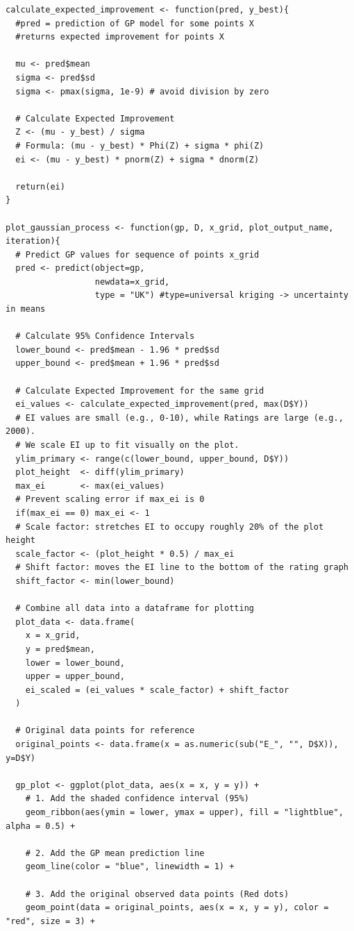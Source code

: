 \documentclass{article}
\begin{document}
\begin{verbatim}
calculate_expected_improvement <- function(pred, y_best){
  #pred = prediction of GP model for some points X
  #returns expected improvement for points X
  
  mu <- pred$mean
  sigma <- pred$sd
  sigma <- pmax(sigma, 1e-9) # avoid division by zero

  # Calculate Expected Improvement
  Z <- (mu - y_best) / sigma
  # Formula: (mu - y_best) * Phi(Z) + sigma * phi(Z)
  ei <- (mu - y_best) * pnorm(Z) + sigma * dnorm(Z)
  
  return(ei)
}

plot_gaussian_process <- function(gp, D, x_grid, plot_output_name, iteration){
  # Predict GP values for sequence of points x_grid
  pred <- predict(object=gp,
                  newdata=x_grid,
                  type = "UK") #type=universal kriging -> uncertainty in means
  
  # Calculate 95% Confidence Intervals
  lower_bound <- pred$mean - 1.96 * pred$sd
  upper_bound <- pred$mean + 1.96 * pred$sd
  
  # Calculate Expected Improvement for the same grid
  ei_values <- calculate_expected_improvement(pred, max(D$Y))
  # EI values are small (e.g., 0-10), while Ratings are large (e.g., 2000).
  # We scale EI up to fit visually on the plot.
  ylim_primary <- range(c(lower_bound, upper_bound, D$Y))
  plot_height  <- diff(ylim_primary)
  max_ei       <- max(ei_values)
  # Prevent scaling error if max_ei is 0
  if(max_ei == 0) max_ei <- 1 
  # Scale factor: stretches EI to occupy roughly 20% of the plot height
  scale_factor <- (plot_height * 0.5) / max_ei 
  # Shift factor: moves the EI line to the bottom of the rating graph
  shift_factor <- min(lower_bound)
  
  # Combine all data into a dataframe for plotting
  plot_data <- data.frame(
    x = x_grid,
    y = pred$mean,
    lower = lower_bound,
    upper = upper_bound,
    ei_scaled = (ei_values * scale_factor) + shift_factor
  )
  
  # Original data points for reference
  original_points <- data.frame(x = as.numeric(sub("E_", "", D$X)), y=D$Y)
  
  gp_plot <- ggplot(plot_data, aes(x = x, y = y)) +
    # 1. Add the shaded confidence interval (95%)
    geom_ribbon(aes(ymin = lower, ymax = upper), fill = "lightblue", alpha = 0.5) +
    
    # 2. Add the GP mean prediction line
    geom_line(color = "blue", linewidth = 1) +
    
    # 3. Add the original observed data points (Red dots)
    geom_point(data = original_points, aes(x = x, y = y), color = "red", size = 3) +
    

\end{verbatim}
\end{document}
